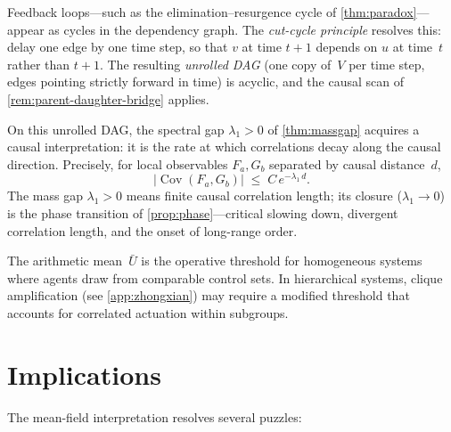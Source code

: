 \begin{remark}
\label{rem:causal-mass-gap}
Feedback loops---such as the elimination--resurgence cycle of
\cref{thm:paradox}---appear as cycles in the dependency graph.
The \emph{cut-cycle principle} resolves this: delay one edge
by one time step, so that $v$ at time $t{+}1$ depends on $u$
at time~$t$ rather than $t{+}1$.  The resulting \emph{unrolled
DAG} (one copy of~$V$ per time step, edges pointing strictly
forward in time) is acyclic, and the causal scan of
\cref{rem:parent-daughter-bridge} applies.

On this unrolled DAG, the spectral gap
$\lambda_1 > 0$ of \cref{thm:massgap} acquires a causal
interpretation: it is the rate at which correlations decay
along the causal direction.  Precisely, for local observables
$F_a, G_b$ separated by causal distance~$d$,
\[
  |\operatorname{Cov}(F_a, G_b)|
  \;\leq\;
  C\,e^{-\lambda_1\, d}.
\]
The mass gap $\lambda_1 > 0$ means finite causal correlation
length; its closure ($\lambda_1 \to 0$) is the phase
transition of \cref{prop:phase}---critical slowing down,
divergent correlation length, and the onset of long-range
order.
\end{remark}

\begin{remark}\label{rem:meanfield-validity}
The arithmetic mean~$\bar{U}$ is the operative threshold for
homogeneous systems where agents draw from comparable control
sets.  In hierarchical systems, clique amplification
(see \cref{app:zhongxian}) may require a modified threshold
that accounts for correlated actuation within subgroups.
\end{remark}

\section{Implications}

The mean-field interpretation resolves several puzzles:

